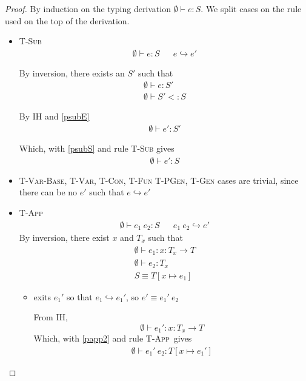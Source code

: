 \documentclass[10pt,a4paper]{article}
\newcommand\tfun[3]{\ensuremath{#1 : #2 \rightarrow #3}}
\newcommand\eapp[2]{\ensuremath{{#1} \ {#2}}}
\newcommand\tapp{\rulename{T-App}}
\newcommand\tsub{\rulename{T-Sub}}
\newcommand\tcon{\rulename{T-Con}}
\newcommand\tgen{\rulename{T-Gen}}
\newcommand\isSub[3]{\ensuremath{{#1}\vdash {#2}<:{#3}}}
\newcommand\hastype[3]{\ensuremath{{#1}\vdash {#2}:{#3}}}
\newcommand\eval[2]{\ensuremath{{#1}\hookrightarrow {#2}}}
\newcommand\hastypeEmp[2]{\hastype{\emptyset}{#1}{#2}}
\newcommand\isSubEmp[2]{\isSub{\emptyset}{#1}{#2}}
\newcommand\rulename[1]{\textsc{#1}}
\newcommand\sub[2]{\ensuremath{\left[ #1 \mapsto #2 \right]}}
\begin{document}
\begin{proof}
By induction on the typing derivation \hastypeEmp{e}{S}.
We split cases on the rule used on the top of the derivation.

\begin{itemize}
\item\tsub 
\begin{align*}
\hastypeEmp{e}{S} && \eval{e}{e'}
\end{align*}

By inversion, there exists an $S'$ such that 
\begin{align}
\hastypeEmp{e}{S'} 	\label{psubE}\\
\isSubEmp{S'}{S}		\label{psubS}
\end{align}

By IH and \ref{psubE}
\begin{align}
\hastypeEmp{e'}{S'}
\end{align}

Which, with \ref{psubS} and rule \rulename{T-Sub} gives
\begin{align}
\hastypeEmp{e'}{S}
\end{align}

\item	\rulename{T-Var-Base}, 
		\rulename{T-Var}, 
		\tcon, 
		\rulename{T-Fun}
		\rulename{T-PGen},
		\tgen
cases are trivial, since there can be no $e'$ such that \eval{e}{e'}	

\item \rulename{T-App}
\begin{align*}
\hastypeEmp{\eapp{e_1}{e_2}}{S} && \eval{\eapp{e_1}{e_2}}{e'} 
\end{align*}
By inversion, there exist $x$ and $T_x$ such that 
\begin{align}
\hastypeEmp{e_1}{\tfun{x}{T_x}{T}} 		\label{papp1}\\
\hastypeEmp{e_2}{T_x}					\label{papp2}\\
S \equiv T\sub{x}{e_1}					\label{pappS}
\end{align}

\begin{itemize}
	\item exits $e_1'$ so that \eval{e_1}{e_1'}, so $e' \equiv \eapp{e_1'}{e_2}$

From IH, $$ \hastypeEmp{e_1'}{\tfun{x}{T_x}{T}}$$
Which, with \ref{papp2} and rule \tapp\ gives 
\begin{align}
\hastypeEmp{\eapp{e_1'}{e_2}}{T\sub{x}{e_1'}} \label{prese1}
\end{align}


\end{itemize}
\end{itemize}
\end{proof}
\end{document}

